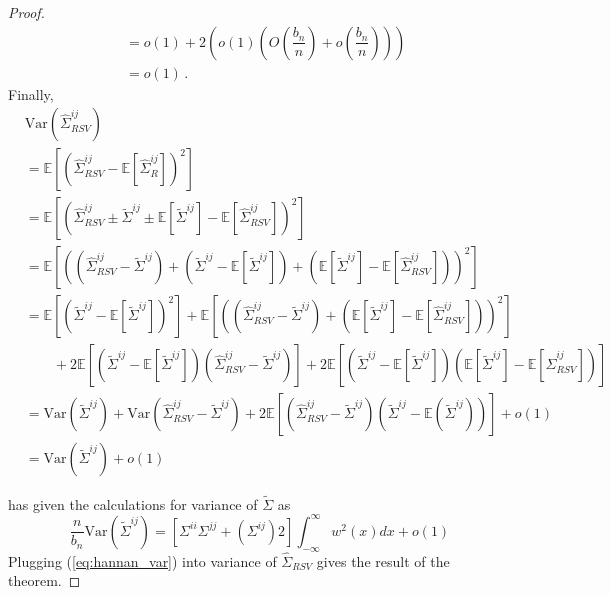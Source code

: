 \documentclass[12pt]{article}
\newcommand{\E}{\mathbb{E}}
\newcommand{\Var}{\text{Var}}
\theoremstyle{remark}
\begin{document}
\begin{proof}
\begin{align*}
& = o(1) + 2\left(o(1) \left(O\left( \dfrac{b_n}{n}\right)  + o\left( \dfrac{b_n}{n}\right) \right)  \right) \\ 
& = o(1)\,.
\end{align*}
%
Finally,
\begin{align*}
 & \Var\left(\hat{\Sigma}_{RSV}^{ij} \right)\\
  & = \E \left[ \left(\hat{\Sigma}_{RSV}^{ij}  - \E \left[\hat{\Sigma}_{R}^{ij}  \right] \right)^2 \right]\\
& = \E \left[ \left(\hat{\Sigma}_{RSV}^{ij} \pm \tilde{\Sigma}^{ij} \pm \E \left[ \tilde{\Sigma}^{ij}\right] - \E \left[\hat{\Sigma}_{RSV}^{ij}  \right] \right)^2 \right]\\
& = \E\left[ \left( \left(\hat{\Sigma}_{RSV}^{ij} - \tilde{\Sigma}^{ij} \right) + \left(\tilde{\Sigma}^{ij}  - \E\left[\tilde{\Sigma}^{ij}\right]\right) + \left(\E\left[\tilde{\Sigma}^{ij}\right] - \E \left[\hat{\Sigma}_{RSV}^{ij}  \right] \right)  \right)^2 \right] \\ 
& =  \E\left[ \left(\tilde{\Sigma}^{ij}  - \E\left[\tilde{\Sigma}^{ij}\right]\right)^2 \right] + \E \left[ \left(\left(\hat{\Sigma}_{RSV}^{ij} - \tilde{\Sigma}^{ij} \right) + \left(\E\left[\tilde{\Sigma}^{ij}\right] - \E \left[\hat{\Sigma}_{RSV}^{ij}  \right] \right) \right)^2 \right] \\
& \quad \quad + 2\E\left[\left(\tilde{\Sigma}^{ij}  - \E\left[\tilde{\Sigma}^{ij}\right]\right) \left(\hat{\Sigma}_{RSV}^{ij} - \tilde{\Sigma}^{ij} \right)\right] + 2 \E\left[\left(\tilde{\Sigma}^{ij}  - \E\left[\tilde{\Sigma}^{ij}\right]\right) \left(\E \left[\tilde{\Sigma}^{ij}\right] - \E \left[\hat{\Sigma}_{RSV}^{ij}  \right] \right)\right]\\
& = \Var\left( \tilde{\Sigma}^{ij}\right) + \Var\left(\hat{\Sigma}_{RSV}^{ij} - \tilde{\Sigma}^{ij} \right) + 2 \E\left[ \left(\hat{\Sigma}_{RSV}^{ij} -  \tilde{\Sigma}^{ij} \right) \left(\tilde{\Sigma}^{ij}  - \E \left( \tilde{\Sigma}^{ij} \right) \right) \right] + o(1)\\
& = \Var\left( \tilde{\Sigma}^{ij}\right) + o(1)
\end{align*}

\cite{hannan2009multiple} has given the calculations for variance of $\tilde{\Sigma}$ as 
\begin{equation} \label{eq:hannan_var}
\dfrac{n}{b_n}\Var(\tilde{\Sigma}^{ij}) = [\Sigma^{ii}\Sigma^{jj} + \left(\Sigma^{ij} \right)2]\int_{-\infty}^{\infty}w^2(x)dx + o(1)    
\end{equation}
Plugging (\ref{eq:hannan_var}) into variance of $\hat{\Sigma}_{RSV}$ gives the result of the theorem.
 
\end{proof}

\singlespacing


\end{document}
